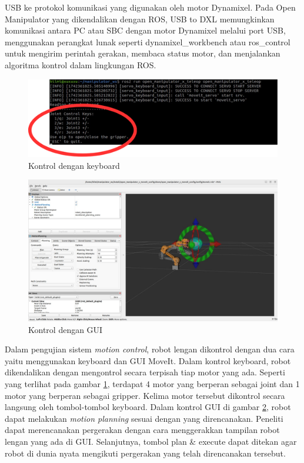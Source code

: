 USB ke protokol komunikasi yang digunakan oleh motor Dynamixel. Pada Open Manipulator yang dikendalikan dengan ROS,
USB to DXL memungkinkan komunikasi antara PC atau SBC dengan motor Dynamixel melalui port USB, menggunakan perangkat lunak
seperti dynamixel\_workbench atau ros\_control untuk mengirim perintah gerakan,
membaca status motor, dan menjalankan algoritma kontrol dalam lingkungan ROS.
\begin{figure} [H] \centering
    \includegraphics[scale=0.8]{gambar/keyboard control anotated.png}
    \caption{Kontrol dengan keyboard}
    \label{fig:keyboard_control}
  \end{figure}
\begin{figure} [H] \centering
    \includegraphics[scale=0.3]{gambar/moveit gui.jpeg}
    \caption{Kontrol dengan GUI}
    \label{fig:moveit_gui}
\end{figure}
Dalam pengujian sistem \emph{motion control}, robot lengan dikontrol dengan dua cara yaitu menggunakan keyboard dan GUI MoveIt.
Dalam kontrol keyboard, robot dikendalikan dengan mengontrol secara terpisah tiap motor yang ada.
Seperti yang terlihat pada gambar \ref{fig:keyboard_control}, terdapat 4 motor yang berperan sebagai joint
dan 1 motor yang berperan sebagai gripper. Kelima motor tersebut dikontrol secara langsung oleh tombol-tombol keyboard.
Dalam kontrol GUI di gambar \ref{fig:moveit_gui}, robot dapat melakukan \emph{motion planning} sesuai dengan yang direncanakan.
Peneliti dapat merencanakan pergerakan dengan cara menggerakkan tampilan robot lengan yang ada di GUI. Selanjutnya,
tombol plan \& execute dapat ditekan agar robot di dunia nyata mengikuti pergerakan yang telah direncanakan tersebut.


